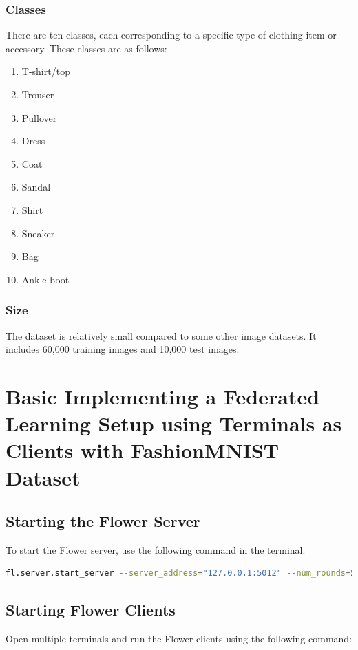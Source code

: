 \documentclass{article}
\begin{document}
\subsubsection{Classes}
There are ten classes, each corresponding to a specific type of clothing item or accessory. These classes are as follows:

\begin{enumerate}
    \item T-shirt/top
    \item Trouser
    \item Pullover
    \item Dress
    \item Coat
    \item Sandal
    \item Shirt
    \item Sneaker
    \item Bag
    \item Ankle boot
\end{enumerate}

\subsubsection{Size}
The dataset is relatively small compared to some other image datasets. It includes 60,000 training images and 10,000 test images.

\section{Basic Implementing a Federated Learning Setup using Terminals as Clients with FashionMNIST Dataset}

\subsection{Starting the Flower Server}
To start the Flower server, use the following command in the terminal:

\begin{lstlisting}[language=sh, caption={Starting the Flower Server}]
fl.server.start_server --server_address="127.0.0.1:5012" --num_rounds=5 --max_msg_len=1000000
\end{lstlisting}

\subsection{Starting Flower Clients}
Open multiple terminals and run the Flower clients using the following command:
\end{document}
